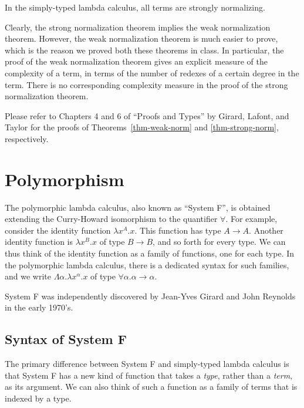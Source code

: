 \documentclass[12pt]{article}
\begin{document}
\begin{theorem}\label{thm-strong-norm}
  In the simply-typed lambda calculus, all terms are strongly
  normalizing.
\end{theorem}

Clearly, the strong normalization theorem implies the weak
normalization theorem. However, the weak normalization theorem is much
easier to prove, which is the reason we proved both these theorems in
class. In particular, the proof of the weak normalization theorem
gives an explicit measure of the complexity of a term, in terms of the
number of redexes of a certain degree in the term. There is no
corresponding complexity measure in the proof of the strong
normalization theorem.

Please refer to Chapters 4 and 6 of ``Proofs and Types'' by
Girard, Lafont, and Taylor {\cite{GLT89}} for the proofs of
Theorems~\ref{thm-weak-norm} and {\ref{thm-strong-norm}},
respectively. 

\section{Polymorphism}

The polymorphic lambda calculus, also known as ``System F'', is
obtained extending the Curry-Howard isomorphism to the quantifier
$\forall$. For example, consider the identity function $\lambda
x^A.x$.  This function has type $A\to A$. Another identity function is
$\lambda x^B.x$ of type $B\to B$, and so forth for every type. We can
thus think of the identity function as a family of functions, one for
each type. In the polymorphic lambda calculus, there is a dedicated
syntax for such families, and we write $\Lambda\alpha.\lambda
x^\alpha.x$ of type $\forall\alpha.\alpha\to\alpha$.

System F was independently discovered by Jean-Yves Girard and John
Reynolds in the early 1970's.

\subsection{Syntax of System F}

The primary difference between System F and simply-typed lambda
calculus is that System F has a new kind of function that takes a {\em
  type}, rather than a {\em term}, as its argument. We can also think
of such a function as a family of terms that is indexed by a type.
\end{document}
